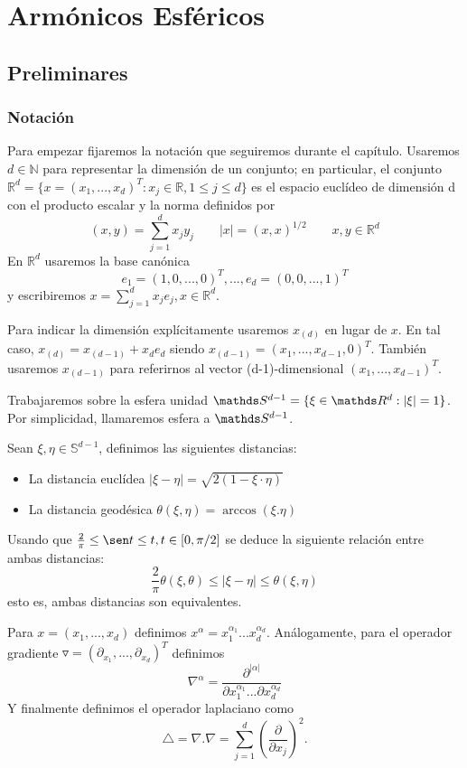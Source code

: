 \chapter[Armónicos Esféricos]
        {Armónicos Esféricos}
\section{Preliminares}
\subsection{Notación}
Para empezar fijaremos la notación que seguiremos durante el capítulo. Usaremos $d\in\mathds{N}$ para representar la dimensión de un conjunto; en particular, el conjunto $\mathds{R}^d = \{x=(x_1,...,x_d)^T : x_j\in\mathds{R},1 \le j \le d\}$ es el espacio euclídeo de dimensión d con el producto escalar y la norma definidos por
$$
(x,y) = \sum_{j=1}^{d} x_jy_j  \qquad |x|=(x,x)^{1/2}  \qquad x,y\in\mathds{R}^d
$$
En $\mathds{R}^d$ usaremos la base canónica
$$
e_1=(1,0,...,0)^T, ..., e_d=(0,0,...,1)^T
$$
y escribiremos $x = \sum_{j=1}^{d} x_je_j, x\in\mathds{R}^d$.
\medskip

Para indicar la dimensión explícitamente usaremos $x_{(d)}$ en lugar de $x$. En tal caso, $x_{(d)} = x_{(d-1)}+x_de_d$ siendo $x_{(d-1)}=(x_1,...,x_{d-1},0)^T$. También usaremos $x_{(d-1)}$ para referirnos al vector (d-1)-dimensional $(x_1,...,x_{d-1})^T$.
\medskip

Trabajaremos sobre la esfera unidad $\sphere = \{\xi\in\R : |\xi| = 1\}$. Por simplicidad, llamaremos esfera a $\sphere$.
\begin{defn} Sean $\xi,\eta\in\mathds{S}^{d-1}$, definimos las siguientes distancias:
	\begin{itemize}
		\item La distancia euclídea $|\xi-\eta| = \sqrt{2(1-\xi\cdot\eta)}$
		\item La distancia geodésica $\theta(\xi,\eta)=\arccos(\xi.\eta)$
	\end{itemize}	
\end{defn}

\begin{rem}Usando que $\frac{2}{\pi} \le \sen t \le t,t\in[0,\pi/2]$ se deduce la siguiente relación entre ambas distancias:
	$$
	\frac{2}{\pi}\theta(\xi,\theta) \le |\xi - \eta| \le \theta(\xi,\eta)
	$$ 
esto es, ambas distancias son equivalentes.
\end{rem}

Para $x =(x_1,...,x_d)$ definimos $x^\alpha = x_1^{\alpha_1}...x_d^{\alpha_d}$. Análogamente,
para el operador gradiente $\triangledown = (\partial_{x_1},...,\partial_{x_d})^T$ definimos
$$
	\nabla^\alpha = \frac{\partial^{|\alpha|}}{\partial x_1^{\alpha_1}...\partial x_d^{\alpha_d}}
$$
Y finalmente definimos el operador laplaciano como
$$ 
	\triangle = \nabla.\nabla = \sum_{j=1}^{d}(\frac{\partial}{\partial x_j})^2 .
$$


